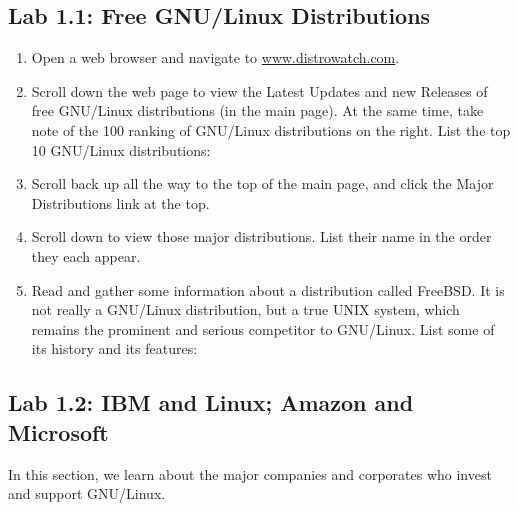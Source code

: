 \subsection*{Lab 1.1: Free GNU/Linux Distributions} 

\begin{enumerate}
\item Open a web browser and navigate to {\url{www.distrowatch.com}}. 
\item Scroll down the web page to view the Latest Updates and new Releases of free GNU/Linux distributions (in the main page). At the same time, take note of the 100 ranking of GNU/Linux distributions on the right. List the top 10 GNU/Linux distributions:

\vspace{1.5in}

\item Scroll back up all the way to the top of the main page, and click the Major Distributions link at the top. 

\item Scroll down to view those major distributions. List their name in the order they each appear. 

\vspace{1in}
 
\item Read and gather some information about a distribution called FreeBSD. It is not really a GNU/Linux distribution, but a true UNIX system, which remains the prominent and serious competitor to GNU/Linux. List some of its history and its features:

\vspace{1in}


\end{enumerate}

\subsection*{Lab 1.2: IBM and Linux; Amazon and Microsoft}
In this section, we learn about the major companies and corporates who invest and support GNU/Linux. 

